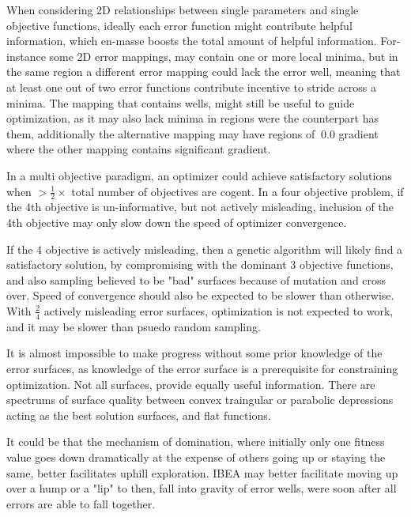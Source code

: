    When considering 2D relationships between single parameters and single objective functions, ideally each error function might contribute helpful information, which en-masse boosts the total amount of helpful information. For-instance some 2D error mappings, may contain one or more local minima, but in the same region a different error mapping could lack the error well, meaning that at least one out of two error functions contribute incentive to stride across a minima. The mapping that contains wells, might still be useful to guide optimization, as it may also lack minima in regions were the counterpart has them, additionally the alternative mapping may have regions of $~0.0$ gradient where the other mapping contains significant gradient.
   
   
   In a multi objective paradigm, an optimizer could achieve satisfactory solutions when $> \frac{1}{2} \times$ total number of objectives are cogent. In a four objective problem, if the $4$th objective is un-informative, but not actively misleading, inclusion of the 4th objective may only slow down the speed of optimizer convergence.
   
   If the $4$ objective is actively misleading, then a genetic algorithm will likely find a satisfactory solution, by compromising with the dominant $3$ objective functions, and also sampling believed to be "bad" surfaces because of mutation and cross over. Speed of convergence should also be expected to be slower than otherwise. With $\frac{2}{4}$ actively misleading error surfaces, optimization is not expected to work, and it may be slower than psuedo random sampling.
   
   
   It is almost impossible to make progress without some prior knowledge of the error surfaces, as knowledge of the error surface is a prerequisite for constraining optimization. Not all surfaces, provide equally useful information. There are spectrums of surface quality between convex traingular or parabolic depressions acting as the best solution surfaces, and flat functions. 
   
   It could be that the mechanism of domination, where initially only one fitness value goes down dramatically at the expense of others going up or staying the same, better facilitates uphill exploration.
IBEA may better facilitate moving up over a hump or a "lip" to then, fall into gravity of error wells, were soon after all errors are able to fall together.

